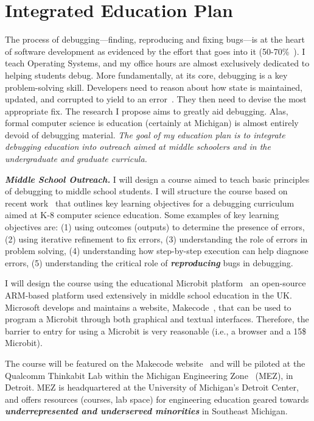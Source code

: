 \section{Integrated Education Plan}
\label{sec:education}

The process of debugging---finding, reproducing and fixing bugs---is at the heart of software development as evidenced by the effort that goes into it (50-70\%~\cite{rti_2002_EconomicImpactsInadequate,goodliffe_2015_BecomingBetterProgrammer,economicimpacttesting}). I teach Operating Systems, and my office hours are almost exclusively dedicated to helping students debug. More fundamentally, at its core, debugging is a key problem-solving skill. Developers need to reason about how state is maintained, updated, and corrupted to yield to an error~\cite{debugstate}. They then need to devise the most appropriate fix. The research I propose aims to greatly aid debugging. Alas, formal computer science is education (certainly at Michigan) is almost entirely devoid of debugging material. \textit{The goal of my education plan is to integrate debugging education into outreach aimed at middle schoolers and in the undergraduate and graduate curricula.}

\noindent \textit{\textbf{Middle School Outreach.}} I will design a course aimed to teach basic principles of debugging to middle school students. I will structure the course based on recent work~\cite{debuggingtrajectories} that outlines key learning objectives for a debugging curriculum aimed at K-8 computer science education. Some examples of key learning objectives are: (1) using outcomes (outputs) to determine the presence of errors, (2) using iterative refinement to fix errors, (3) understanding the role of errors in problem solving, (4) understanding how step-by-step execution can help diagnose errors, (5) understanding the critical role of \textbf{\textit{reproducing}} bugs in debugging. 

I will design the course using the educational Microbit platform~\cite{Microbit27:online} an open-source ARM-based platform used extensively in middle school education in the UK. Microsoft develops and maintains a website, Makecode~\cite{Microsof90:online}, that can be used to program a Microbit through both graphical and textual interfaces. Therefore, the barrier to entry for using a Microbit is very reasonable (i.e., a browser and a 15\$ Microbit). 

The course will be featured on the Makecode website~\cite{Microsof90:online} and will be piloted at the Qualcomm Thinkabit Lab within the Michigan Engineering Zone~\cite{mez} (MEZ), in Detroit. MEZ is headquartered at the University of Michigan's Detroit Center, and offers resources (courses, lab space) for engineering education geared towards \textit{\textbf{underrepresented and underserved minorities}} in Southeast Michigan.

